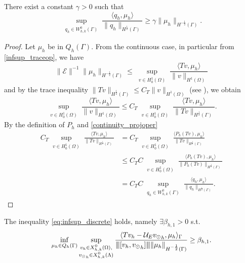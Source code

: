 \begin{lemma}\label{lemma:trspace_infsup} 
There exist a constant $\gamma >0$ such that
\begin{equation*}
\sup_{\substack{q_h \in W_{h,k}^0(\Gamma)}} \frac{\langle q_h , \mu_h \rangle}{ \|q_h\|_{H^{\frac 12}(\Gamma)}} \geq \gamma \|\mu_h\|_{H^{-\frac 12}(\Gamma)}.
\end{equation*} 
\end{lemma}
\begin{proof}
Let $\mu_h$ be in $Q_h(\Gamma)$. From the continuous case, in particular from \eqref{infsup_traceop}, we have
\begin{equation*}
\|\mathcal{E}\|^{-1} \|\mu_h\|_{H^{-\frac 12}(\Gamma)} \leq \sup_{\substack{v \in H^1_0(\Omega)}} \frac{\langle Tv , \mu_h \rangle}{\|v\|_{H^1(\Omega)}} 
\end{equation*}
and by the trace inequality $\|Tv\|_{H^\frac 12 (\Gamma)} \leq C_T \|v\|_{H^1(\Omega)}$ (see \cite[7.56]{adams1975pure}), we obtain 
\begin{equation*}
\sup_{\substack{v \in H^1_0(\Omega)}} \frac{\langle T v , \mu_h \rangle}{\|v\|_{H^1(\Omega)}}
\leq C_T \sup_{\substack{v \in H^1_0(\Omega)}} \frac{\langle T v , \mu_h \rangle}{ \|Tv\|_{H^{\frac 12}(\Gamma)}}.
\end{equation*}
By the definition of $P_h$ and \eqref{continuity_projoper} 
\begin{equation*}
\begin{split}
C_T \sup_{\substack{v \in H^1_0(\Omega)}} \frac{\langle T v , \mu_h \rangle}{ \|Tv\|_{H^{\frac 12}(\Gamma)}}&= C_T \sup_{\substack{v \in H^1_0(\Omega)}} \frac{\langle P_h(T v) , \mu_h \rangle}{ \|Tv\|_{H^{\frac 12}(\Gamma)}}\\
&\leq  C_T C \sup_{\substack{v \in H^1_0(\Omega)}} \frac{\langle P_h(T v) , \mu_h \rangle}{ \|P_h(Tv)\|_{H^{\frac 12}(\Gamma)}}\\
&= C_T C \sup_{\substack{q_h \in W_{h,k}^0(\Gamma)}} \frac{\langle q_h , \mu_h \rangle}{  \|q_h\|_{H^{\frac 12}(\Gamma)}}.
\end{split}
\end{equation*}
\end{proof}

\begin{theorem} The inequality \eqref{eq:infsup_discrete} holds, namely 
$\exists \beta_{h,1} >0$ s.t.
\begin{equation}\label{inf_sup_discrete_prob1}
\inf_{\mu_h \in Q_h(\Gamma)} 
\sup_{\substack{v_h \in X^0_{h,k}(\Omega),\\ {\vd}_h \in X^0_{h,k}(\Lambda)}} \frac{ \langle T v_h - \mathcal{U}_E {\vd}_h, \mu_h \rangle _{\Gamma}} {\vertiii{[v_h, {\vd} _h]} \|\mu_h\|_{H^{-\frac 12 }(\Gamma)}} 
\geq \beta_{h,1}. 
\end{equation}
\end{theorem}

